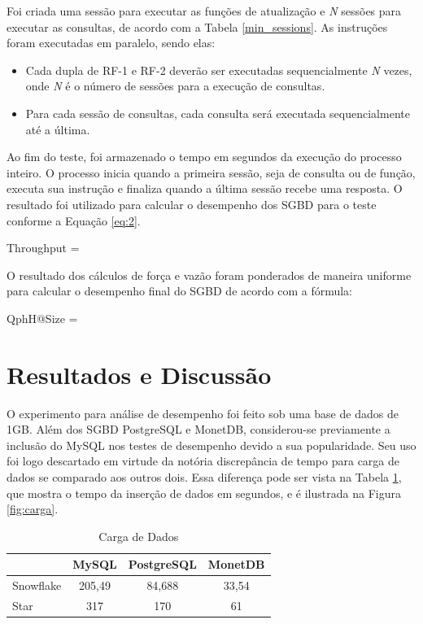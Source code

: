 \documentclass[conference]{IEEEtran}
\begin{document}
Foi criada uma sessão para executar as funções de atualização e \textit{N} sessões para executar as consultas, de acordo com a Tabela \ref{min_sessions}. As instruções foram executadas em paralelo, sendo elas:

\begin{itemize}
	\item Cada dupla de RF-1 e RF-2 deverão ser executadas sequencialmente \textit{N} vezes, onde \textit{N} é o número de sessões para a execução de consultas.
	\item Para cada sessão de consultas, cada consulta será executada sequencialmente até a última.
\end{itemize}

Ao fim do teste, foi armazenado o tempo em segundos da execução do processo inteiro. O processo inicia quando a primeira sessão, seja de consulta ou de função, executa sua instrução e finaliza quando a última sessão recebe uma resposta. O resultado foi utilizado para calcular o desempenho dos SGBD para o teste conforme a Equação \ref{eq:2}.

\begin{myequation}%
\label{eq:2}
{\scriptstyle Throughput} =  %
\end{myequation}
%

O resultado dos cálculos de força e vazão foram ponderados de maneira uniforme para calcular o desempenho final do SGBD de acordo com a fórmula:

\begin{myequation}%
\label{eq:3}
{ \scriptstyle QphH@Size =  } %
\end{myequation}
%

\section{Resultados e Discussão}

O experimento para análise de desempenho foi feito sob uma base de dados de 1GB. Além dos SGBD PostgreSQL e MonetDB, considerou-se previamente a inclusão do MySQL nos testes de desempenho devido a sua popularidade. Seu uso foi logo descartado em virtude da notória discrepância de tempo para carga de dados se comparado aos outros dois. Essa diferença pode ser vista na Tabela \ref{tab:carga}, que mostra o tempo da inserção de dados em segundos, e é ilustrada na Figura \ref{fig:carga}.

\begin{table}[htpb]
\centering
\caption{Carga de Dados}
\label{tab:carga}
\begin{tabular}{@{}lccc@{}}
\toprule
          & MySQL  & PostgreSQL & MonetDB \\ \midrule
Snowflake & 205,49 & 84,688     & 33,54   \\
Star      & 317    & 170        & 61      \\ \bottomrule
\end{tabular}
\end{table}
\end{document}
